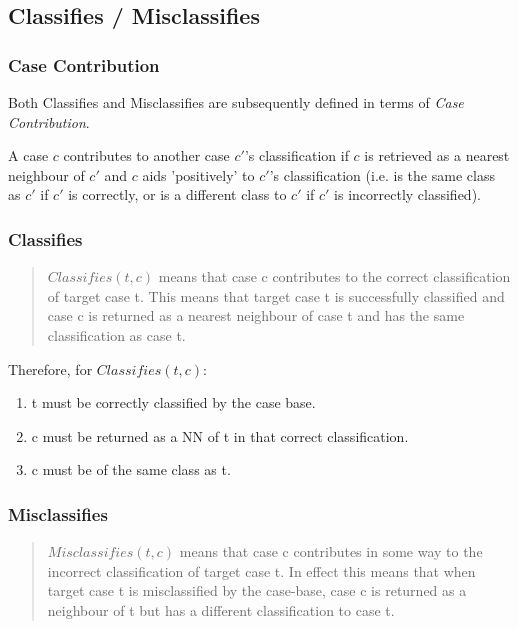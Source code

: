 \documentclass[a4paper,11pt]{report}
\begin{document}
\subsection{Classifies / Misclassifies}
\subsubsection{Case Contribution\label{sec:contributes}}
Both Classifies and Misclassifies are subsequently defined in terms of \emph{Case Contribution}.

A case $c$ contributes to another case $c'$'s classification if $c$ is retrieved as a nearest neighbour of $c'$ and $c$ aids 'positively' to $c'$'s classification (i.e. is the same class as $c'$ if $c'$ is correctly, or is a different class to  $c'$ if  $c'$ is incorrectly classified).
\subsubsection{Classifies}
\begin{quote}
$ Classifies(t, c) $ means that case c contributes to the correct classification of target case t. This means that target case t is successfully classified and case c is returned as a nearest neighbour of case t and has the same classification as case t.\cite{Delany2009}
\end{quote}

Therefore, for $ Classifies(t, c) $:
\begin{enumerate}
	\item t must be correctly classified by the case base.
	\item c must be returned as a NN of t in that correct classification.
	\item c must be of the same class as t.
\end{enumerate}

\subsubsection{Misclassifies}

\begin{quote}
$ Misclassifies(t, c ) $ means that case c contributes in some way to the incorrect classification of target case t. In effect this means that when target case t is misclassified by the case-base, case c is returned as a neighbour of t but has a different classification to case t.\cite{Delany2009}
\end{quote}
\end{document}
